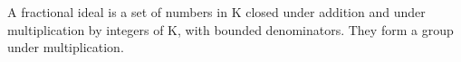 A fractional ideal is a set of numbers in K closed under addition and under multiplication by integers of K, with bounded denominators. They form a group under multiplication.

